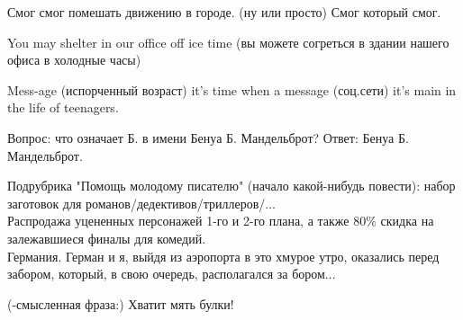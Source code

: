 Смог смог помешать движению в городе. ({\texttit ну или просто}) Смог который смог.


You may shelter in our office off ice time (вы можете согреться в здании нашего офиса в холодные часы)


Mess-age (испорченный возраст) it's time when a message (соц.сети) it's main in the life of teenagers.


Вопрос: что означает Б. в имени Бенуа Б. Мандельброт?
Ответ: Бенуа Б. Мандельброт.


Подрубрика "Помощь молодому писателю" (начало какой-нибудь повести): набор заготовок для романов/дедективов/триллеров/...\\
Распродажа уцененных персонажей 1-го и 2-го плана, а также 80\% скидка на залежавшиеся финалы для комедий.\\
Германия. Герман и я, выйдя из аэропорта в это хмурое утро, оказались перед забором, который, в свою очередь, располагался за бором...


({-смысленная фраза:})
Хватит мять булки!
